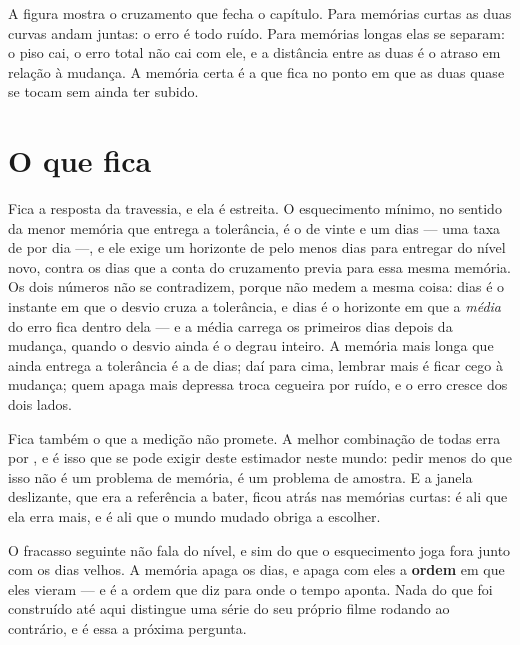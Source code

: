 A figura mostra o cruzamento que fecha o capítulo. Para memórias curtas as duas curvas andam juntas:
o erro é todo ruído. Para memórias longas elas se separam: o piso cai, o erro total não cai com ele,
e a distância entre as duas é o atraso em relação à mudança. A memória certa é a que fica no ponto em
que as duas quase se tocam sem ainda ter subido.

\section{O que fica}

Fica a resposta da travessia, e ela é estreita. O esquecimento mínimo, no sentido da menor memória que entrega a tolerância, é o de vinte e um
dias --- uma taxa de \numEsquecimentoMelhorTaxa{} por
dia ---, e ele exige um horizonte de pelo menos \numEsquecimentoHorizonteCurto{} dias para entregar
\numEsquecimentoTolerancia{} do nível novo, contra os \numEsquecimentoMelhorDias{} dias que a conta
do cruzamento previa para essa mesma memória. Os dois números não se contradizem, porque não medem a
mesma coisa: \numEsquecimentoMelhorDias{} dias é o instante em que o desvio cruza a tolerância, e
\numEsquecimentoHorizonteCurto{} dias é o horizonte em que a \emph{média} do erro fica dentro dela ---
e a média carrega os primeiros dias depois da mudança, quando o desvio ainda é o degrau inteiro. A memória mais longa que ainda entrega a tolerância é a de \numEsquecimentoMemoriaLonga{} dias;
daí para cima, lembrar mais é ficar cego à mudança; quem apaga
mais depressa troca cegueira por ruído, e o erro cresce dos dois lados.

Fica também o que a medição não promete. A melhor combinação de todas erra por
\numEsquecimentoMelhor{}, e é isso que se pode exigir deste estimador neste mundo: pedir menos do que
isso não é um problema de memória, é um problema de amostra. E a janela deslizante, que era a
referência a bater, ficou atrás nas memórias curtas: é ali que ela erra mais, e é ali que o mundo
mudado obriga a escolher.

O fracasso seguinte não fala do nível, e sim do que o esquecimento joga fora junto com os dias velhos.
A memória apaga os dias, e apaga com eles a \textbf{ordem} em que eles vieram --- e é a ordem que diz para
onde o tempo aponta. Nada do que foi construído até aqui distingue uma série do seu próprio filme
rodando ao contrário, e é essa a próxima pergunta.
